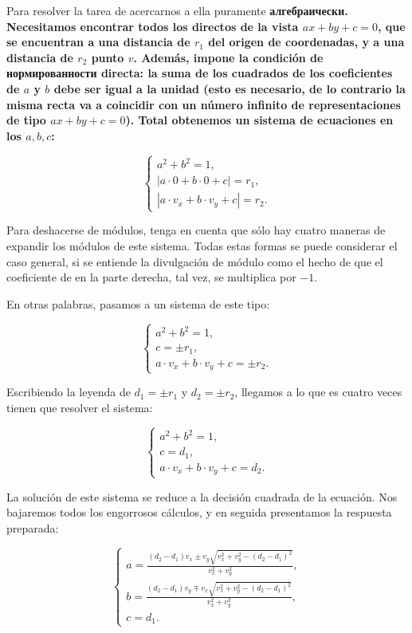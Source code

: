 Para resolver la tarea de acercarnos a ella puramente \bf{алгебраически}. Necesitamos encontrar todos los directos de la vista $ax+by+c=0$, que se encuentran a una distancia de $r_1$ del origen de coordenadas, y a una distancia de $r_2$ punto $v$. Además, impone la condición de нормированности directa: la suma de los cuadrados de los coeficientes de $a$ y $b$ debe ser igual a la unidad (esto es necesario, de lo contrario la misma recta va a coincidir con un número infinito de representaciones de tipo $ax+by+c=0$). Total obtenemos un sistema de ecuaciones en los $a,b,c$:

$$ \begin{cases}
a^2 + b^2 = 1, \\
| a \cdot 0 + b \cdot 0 + c | = r_1, \\
| a \cdot v_x + b \cdot v_y + c | = r_2.
\end{cases} $$

Para deshacerse de módulos, tenga en cuenta que sólo hay cuatro maneras de expandir los módulos de este sistema. Todas estas formas se puede considerar el caso general, si se entiende la divulgación de módulo como el hecho de que el coeficiente de en la parte derecha, tal vez, se multiplica por $-1$.

En otras palabras, pasamos a un sistema de este tipo:

$$ \begin{cases}
a^2 + b^2 = 1, \\
c = \pm r_1, \\
a \cdot v_x + b \cdot v_y + c = \pm r_2.
\end{cases} $$

Escribiendo la leyenda de $d_1 = \pm r_1$ y $d_2 = \pm r_2$, llegamos a lo que es cuatro veces tienen que resolver el sistema:

$$ \begin{cases}
a^2 + b^2 = 1, \\
c = d_1, \\
a \cdot v_x + b \cdot v_y + c = d_2.
\end{cases} $$

La solución de este sistema se reduce a la decisión cuadrada de la ecuación. Nos bajaremos todos los engorrosos cálculos, y en seguida presentamos la respuesta preparada:

$$ \begin{cases}
a = \frac{ (d_2-d_1)v_x \pm v_y \sqrt{ v_x^2 + v_y^2 - (d_2-d_1)^2 } }{ v_x^2 + v_y^2 }, \\
b = \frac{ (d_2-d_1)v_y \mp v_x \sqrt{ v_x^2 + v_y^2 - (d_2-d_1)^2 } }{ v_x^2 + v_y^2 }, \\
c = d_1.
\end{cases} $$

